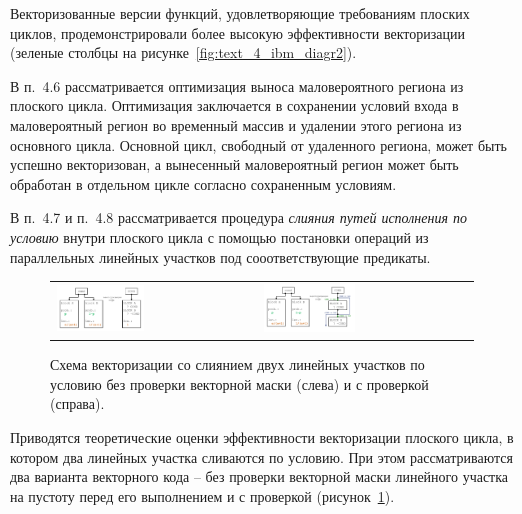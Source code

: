 \documentclass[a4paper,14pt]{extarticle}                     %
\theoremstyle{plain}                                         %
\begin{document}
Векторизованные версии функций, удовлетворяющие требованиям плоских циклов, продемонстрировали более высокую эффективности векторизации (зеленые столбцы на рисунке~\ref{fig:text_4_ibm_diagr2}).


В п.~4.6 рассматривается оптимизация выноса маловероятного региона из плоского цикла.
Оптимизация заключается в сохранении условий входа в маловероятный регион во временный массив и удалении этого региона из основного цикла.
Основной цикл, свободный от удаленного региона, может быть успешно векторизован, а вынесенный маловероятный регион может быть обработан в отдельном цикле согласно сохраненным условиям.


В п.~4.7 и п.~4.8 рассматривается процедура \textit{слияния путей исполнения по условию} внутри плоского цикла с помощью постановки операций из параллельных линейных участков под сооответствующие предикаты.

\begin{figure}[ht]
\centering
\begin{tabular}{ll}
	\includegraphics[width=0.45\textwidth]{./pics/text_4_vec_mrg_under_cond/cond.pdf}
	&
	\includegraphics[width=0.45\textwidth]{./pics/text_4_vec_check_mask/cond.pdf}
\end{tabular}
\singlespacing
{}\caption{Схема векторизации со слиянием двух линейных участков по условию без проверки векторной маски (слева) и с проверкой (справа).}
\label{fig:text_4_vec_mrg_under_cond_cond}
\end{figure}

Приводятся теоретические оценки эффективности векторизации плоского цикла, в котором два линейных участка сливаются по условию.
При этом рассматриваются два варианта векторного кода -- без проверки векторной маски линейного участка на пустоту перед его выполнением и с проверкой (рисунок~\ref{fig:text_4_vec_mrg_under_cond_cond}).
\end{document}
